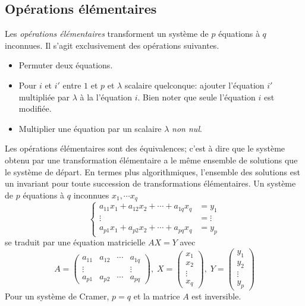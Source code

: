 \subsection{Opérations élémentaires}
 Les \emph{opérations élémentaires} transforment un système de $p$ équations à $q$ inconnues. Il s'agit exclusivement des opérations suivantes.
\begin{itemize}
 \item Permuter deux équations.
 \item Pour $i$ et $i'$ entre $1$ et $p$ et $\lambda$ scalaire quelconque: ajouter l'équation $i'$ multipliée par $\lambda$ à la l'équation $i$. Bien noter que seule l'équation $i$ est modifiée.
 \item Multiplier une équation par un scalaire $\lambda$ \emph{non nul}.
\end{itemize}
Les opérations élémentaires sont des équivalences; c'est à dire que le système obtenu par une transformation élémentaire a le même ensemble de solutions que le système de départ. En termes plus algorithmiques, l'ensemble des solutions est un invariant pour toute succession de transformations élémentaires.\newline
Un système de $p$ équations à $q$ inconnues $x_1,\cdots x_q$
\begin{displaymath}
\left\lbrace 
\begin{aligned}
  a_{1 1}x_1 + a_{1 2}x_2 + \cdots + a_{1 q}x_q &= y_1\\
  \vdots &= \vdots \\
  a_{p 1}x_1 + a_{p 2}x_2 + \cdots + a_{p q}x_q &= y_p
\end{aligned}
\right. 
\end{displaymath}
se traduit par une équation matricielle $A X =Y$ avec 
\begin{displaymath}
A = 
\begin{pmatrix}
  a_{1 1} & a_{1 2} & \cdots & a_{1 q}\\
  \vdots  &         &        & \vdots \\
  a_{p 1} & a_{p 2} & \cdots & a_{p q}
\end{pmatrix},
\;
X = 
\begin{pmatrix}
  x_1 \\ x_2 \\ \vdots \\ x_q
\end{pmatrix},
\;
Y = 
\begin{pmatrix}
  y_1 \\ y_2 \\ \vdots \\ y_p
\end{pmatrix}
\end{displaymath}
Pour un système de Cramer, $p=q$ et la matrice $A$ est inversible.
